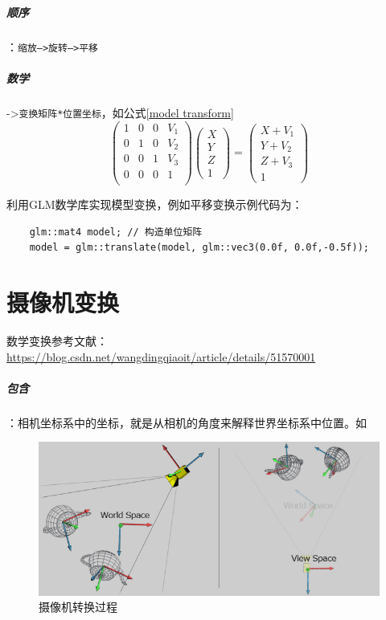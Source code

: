 \documentclass[UTF8,a4paper,12pt]{ctexbook}
\begin{document}
			\subparagraph{顺序}：\verb|缩放–>旋转—>平移|
		
			\subparagraph{数学}->\verb|变换矩阵*位置坐标|，如公式\ref{model transform}
					\begin{equation}\label{model transform}
					\left(
					\begin{array}{cccc}
					1 & 0 & 0& V_1\\
					
					0 & 1 & 0& V_2\\
					
					0 & 0 & 1& V_3\\
					
					0 & 0 & 0& 1\\
					\end{array}
					\right)
					\left(
					\begin{array}{c}
					X\\ 
					Y\\
					Z\\
					1 
					\end{array}	
					\right) 
					=
					\left(
					\begin{array}{c}
					X+V_1\\ 
					Y+V_2\\
					Z+V_3\\
					1 
					\end{array}	
					\right)
					\end{equation}
		
		
			利用GLM数学库实现模型变换，例如平移变换示例代码为：
			\begin{lstlisting}
	glm::mat4 model; // 构造单位矩阵
	model = glm::translate(model, glm::vec3(0.0f, 0.0f,-0.5f));
			\end{lstlisting}
			
	\section{摄像机变换}
			数学变换参考文献：\url{https://blog.csdn.net/wangdingqiaoit/article/details/51570001}
			
			\subparagraph{包含}：相机坐标系中的坐标，就是从相机的角度来解释世界坐标系中位置。如
				\begin{figure}[htbp]
					\centering
					\includegraphics[scale = 0.7]{transferEye.png}
					\caption{摄像机转换过程}
				\end{figure}
			
\end{document}
